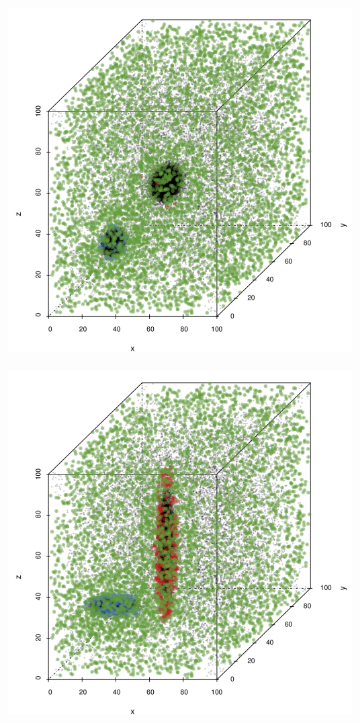 			\begin{figure}
				\centering
				\begin{subfigure}{0.23\textwidth}
					\centering
					\includegraphics[keepaspectratio=true, width=\textwidth, height=0.23\textheight]{discussion/img/ferdosi_2_60000_anisotropy.png}
					\caption{}
					\label{fig:discussion:anisotropy:ferdosi2}
				\end{subfigure}
				\begin{subfigure}{0.23\textwidth}
					\centering
					\includegraphics[keepaspectratio=true, width=\textwidth, height=0.23\textheight]{discussion/img/baakman_2_60000_anisotropy.png}

\end{subfigure}
\end{figure}
